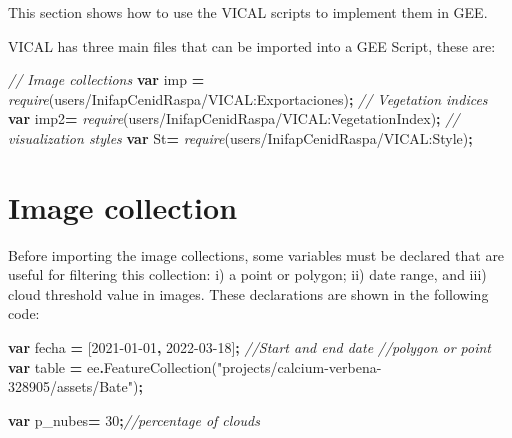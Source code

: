 \documentclass[
]{book}
\newenvironment{Shaded}{\begin{snugshade}}{\end{snugshade}}
\newcommand{\CommentTok}[1]{\textcolor[rgb]{0.56,0.35,0.01}{\textit{#1}}}
\newcommand{\DecValTok}[1]{\textcolor[rgb]{0.00,0.00,0.81}{#1}}
\newcommand{\FunctionTok}[1]{\textcolor[rgb]{0.00,0.00,0.00}{#1}}
\newcommand{\KeywordTok}[1]{\textcolor[rgb]{0.13,0.29,0.53}{\textbf{#1}}}
\newcommand{\NormalTok}[1]{#1}
\newcommand{\OperatorTok}[1]{\textcolor[rgb]{0.81,0.36,0.00}{\textbf{#1}}}
\newcommand{\PreprocessorTok}[1]{\textcolor[rgb]{0.56,0.35,0.01}{\textit{#1}}}
\newcommand{\StringTok}[1]{\textcolor[rgb]{0.31,0.60,0.02}{#1}}
\begin{document}
This section shows how to use the VICAL scripts to implement them in GEE.

VICAL has three main files that can be imported into a GEE Script, these are:

\begin{Shaded}
\begin{Highlighting}[]
\CommentTok{// Image collections}
\KeywordTok{var}\NormalTok{ imp }\OperatorTok{=} \PreprocessorTok{require}\NormalTok{(}\StringTok{\textquotesingle{}users/InifapCenidRaspa/VICAL:Exportaciones\textquotesingle{}}\NormalTok{)}\OperatorTok{;}
\CommentTok{// Vegetation indices}
\KeywordTok{var}\NormalTok{ imp2}\OperatorTok{=} \PreprocessorTok{require}\NormalTok{(}\StringTok{\textquotesingle{}users/InifapCenidRaspa/VICAL:VegetationIndex\textquotesingle{}}\NormalTok{)}\OperatorTok{;} 
\CommentTok{// visualization styles}
\KeywordTok{var}\NormalTok{ St}\OperatorTok{=} \PreprocessorTok{require}\NormalTok{(}\StringTok{\textquotesingle{}users/InifapCenidRaspa/VICAL:Style\textquotesingle{}}\NormalTok{)}\OperatorTok{;}
\end{Highlighting}
\end{Shaded}

\hypertarget{CImg}{%
\section{Image collection}\label{CImg}}

Before importing the image collections, some variables must be declared that are useful for filtering this collection: i) a point or polygon; ii) date range, and iii) cloud threshold value in images. These declarations are shown in the following code:

\begin{Shaded}
\begin{Highlighting}[]
\KeywordTok{var}\NormalTok{ fecha }\OperatorTok{=}\NormalTok{ [}\StringTok{\textquotesingle{}2021{-}01{-}01\textquotesingle{}}\OperatorTok{,} \StringTok{\textquotesingle{}2022{-}03{-}18\textquotesingle{}}\NormalTok{]}\OperatorTok{;} \CommentTok{//Start and end date }
\CommentTok{//polygon or point}
\KeywordTok{var}\NormalTok{ table }\OperatorTok{=}\NormalTok{ ee}\OperatorTok{.}\FunctionTok{FeatureCollection}\NormalTok{(}\StringTok{"projects/calcium{-}verbena{-}328905/assets/Bate"}\NormalTok{)}\OperatorTok{;}

\KeywordTok{var}\NormalTok{ p\_nubes}\OperatorTok{=} \DecValTok{30}\OperatorTok{;}\CommentTok{//percentage of clouds}
\end{Highlighting}
\end{Shaded}
\end{document}
